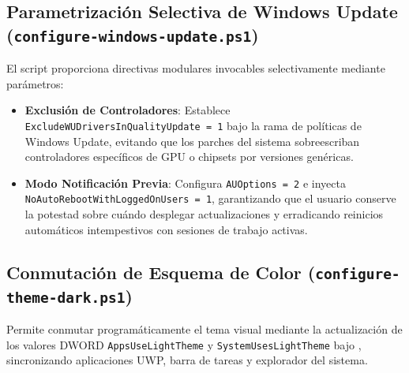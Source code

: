 \documentclass[12pt,a4paper]{report}
\begin{document}
\subsection{Parametrización Selectiva de Windows Update (\texttt{configure-windows-update.ps1})}
El script proporciona directivas modulares invocables selectivamente mediante parámetros:
\begin{itemize}
    \item \textbf{Exclusión de Controladores}: Establece \texttt{ExcludeWUDriversInQualityUpdate = 1} bajo la rama de políticas de Windows Update, evitando que los parches del sistema sobreescriban controladores específicos de GPU o chipsets por versiones genéricas.
    \item \textbf{Modo Notificación Previa}: Configura \texttt{AUOptions = 2} e inyecta \texttt{NoAutoRebootWithLoggedOnUsers = 1}, garantizando que el usuario conserve la potestad sobre cuándo desplegar actualizaciones y erradicando reinicios automáticos intempestivos con sesiones de trabajo activas.
\end{itemize}

\subsection{Conmutación de Esquema de Color (\texttt{configure-theme-dark.ps1})}
Permite conmutar programáticamente el tema visual mediante la actualización de los valores DWORD \texttt{AppsUseLightTheme} y \texttt{SystemUsesLightTheme} bajo , sincronizando aplicaciones UWP, barra de tareas y explorador del sistema.
\end{document}
